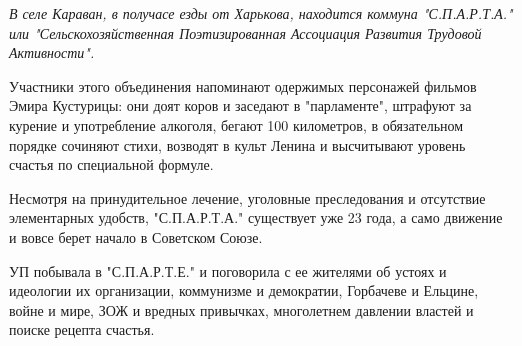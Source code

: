  
 
 

{\em
В селе Караван, в получасе езды от Харькова, находится коммуна "С.П.А.Р.Т.А."
или "Сельскохозяйственная Поэтизированная Ассоциация Развития Трудовой
Активности". 

Участники этого объединения напоминают одержимых персонажей фильмов Эмира
Кустурицы: они доят коров и заседают в "парламенте", штрафуют за курение и
употребление алкоголя, бегают 100 километров, в обязательном порядке сочиняют
стихи, возводят в культ Ленина и высчитывают уровень счастья по специальной
формуле. 

Несмотря на принудительное лечение, уголовные преследования и отсутствие
элементарных удобств, "С.П.А.Р.Т.А." существует уже 23 года, а само движение и
вовсе берет начало в Советском Союзе.

УП побывала в "С.П.А.Р.Т.Е." и поговорила с ее жителями об устоях и идеологии
их организации, коммунизме и демократии, Горбачеве и Ельцине, войне и мире, ЗОЖ
и вредных привычках, многолетнем давлении властей и поиске рецепта счастья.
}
